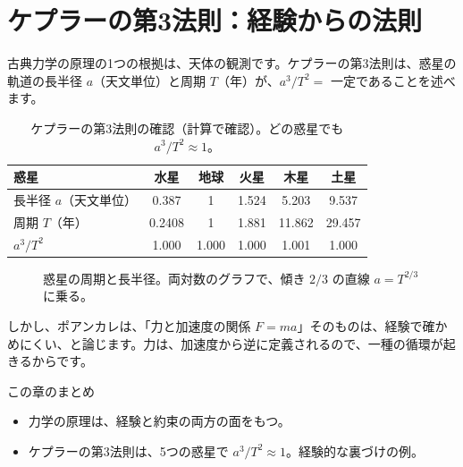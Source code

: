 \documentclass[a4paper,11pt,openany]{ltjsbook}
\begin{document}
\section{ケプラーの第3法則：経験からの法則}

古典力学の原理の1つの根拠は、天体の観測です。ケプラーの第3法則は、惑星の軌道の長半径 $a$（天文単位）と周期 $T$（年）が、$a^3/T^2=$ 一定であることを述べます。

\begin{table}[htbp]
\centering
\begin{tabular}{l|ccccc}
\toprule
惑星 & 水星 & 地球 & 火星 & 木星 & 土星\\
\midrule
長半径 $a$（天文単位） & 0.387 & 1 & 1.524 & 5.203 & 9.537\\
周期 $T$（年） & 0.2408 & 1 & 1.881 & 11.862 & 29.457\\
$a^3/T^2$ & 1.000 & 1.000 & 1.000 & 1.001 & 1.000\\
\bottomrule
\end{tabular}
\caption{ケプラーの第3法則の確認（計算で確認）。どの惑星でも $a^3/T^2\approx1$。}
\end{table}

\begin{figure}[htbp]
\centering
{}
\caption{惑星の周期と長半径。両対数のグラフで、傾き $2/3$ の直線 $a=T^{2/3}$ に乗る。}
\end{figure}

しかし、ポアンカレは、「力と加速度の関係 $F=ma$」そのものは、経験で確かめにくい、と論じます。力は、加速度から逆に定義されるので、一種の循環が起きるからです。

\begin{pointbox}{この章のまとめ}
\begin{itemize}[leftmargin=*]
\item 力学の原理は、経験と約束の両方の面をもつ。
\item ケプラーの第3法則は、5つの惑星で $a^3/T^2\approx1$。経験的な裏づけの例。
\end{itemize}
\end{pointbox}
\end{document}
